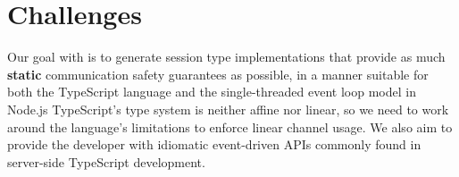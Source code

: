 \section{Challenges}
\label{section:nodechallenges}

Our goal with \nodecodegen is to
generate session type implementations that
provide as much \textbf{static} 
communication safety guarantees
as possible,
in a manner suitable for both the TypeScript language 
and the single-threaded event loop model in Node.js
TypeScript's type system
is neither affine nor linear, so we need to work around the 
language's limitations to enforce linear channel usage.
We also aim to provide the developer with
idiomatic event-driven APIs commonly found in
server-side TypeScript development.